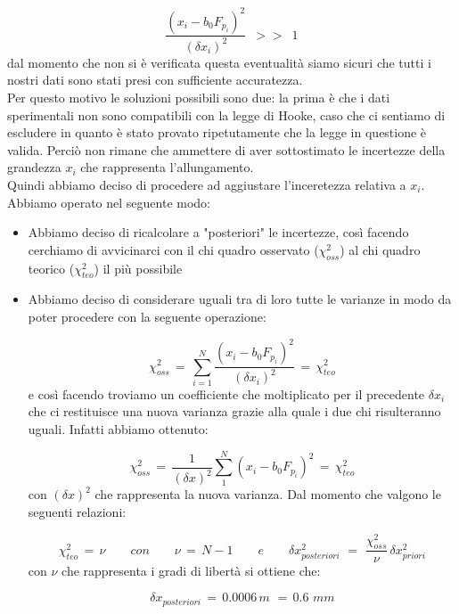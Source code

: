 \begin{equation*}
	\frac{(x_i - b_0 F_{p_i})^2}{(\delta x_i)^2} \,\,\, >> \,\,\, 1
\end{equation*}
%
dal momento che non si è verificata questa eventualità siamo sicuri che tutti i nostri dati sono stati presi con sufficiente accuratezza.\\
Per questo motivo le soluzioni possibili sono due: la prima è che i dati sperimentali non sono compatibili con la legge di Hooke, caso che ci sentiamo di escludere in quanto è stato provato ripetutamente che la legge in questione è valida. Perciò non rimane che ammettere di aver sottostimato le incertezze della grandezza $x_i$ che rappresenta l'allungamento.\\
Quindi abbiamo deciso di procedere ad aggiustare l'inceretezza relativa a $x_i$. Abbiamo operato nel seguente modo:
\begin{itemize}
\item{Abbiamo deciso di ricalcolare a "posteriori" le incertezze, così facendo cerchiamo di avvicinarci con il chi quadro osservato ($\chi_{oss}^2$) al chi quadro teorico ($\chi_{teo}^2$) il più possibile}
\item{Abbiamo deciso di considerare uguali tra di loro tutte le varianze in modo da poter procedere con la seguente operazione:

	\begin{equation*}
		\chi_{oss}^2 \,=\, \sum_{i=1}^{N} \frac{(x_i - b_0 F_{p_i})^2}{(\delta x_i)^2} \,=\, \chi_{teo}^2 
	\end{equation*}
	e così facendo troviamo un coefficiente che moltiplicato per il precedente $\delta x_i$ che ci restituisce una nuova varianza grazie alla quale i due chi risulteranno uguali. Infatti abbiamo ottenuto:
	
	\begin{equation*}
		\chi_{oss}^2 \,=\, \frac{1}{(\delta x)^2} \sum_{1}^{N} (x_i - b_0 F_{p_i})^2  \,=\, \chi_{teo}^2
	\end{equation*}
	con $(\delta x)^2$ che rappresenta la nuova varianza. Dal momento che valgono le seguenti relazioni:
	
	\begin{equation*}
		\chi_{teo}^2 \,=\, \nu \quad \quad con \quad \quad
		\nu \,=\, N - 1 \quad \quad e \quad \quad
		\delta x_{posteriori}^2 \,\,=\,\, \frac{\chi_{oss}^2}{\nu} \, \delta x_{priori}^2
	\end{equation*}
	con $\nu$ che rappresenta i gradi di libertà si ottiene che:
	
	\begin{equation*}
		\delta x_{posteriori} \,=\, 0.0006 \,m \,\,=\, 0.6 \,\, mm
	\end{equation*}}	 
\end{itemize}
